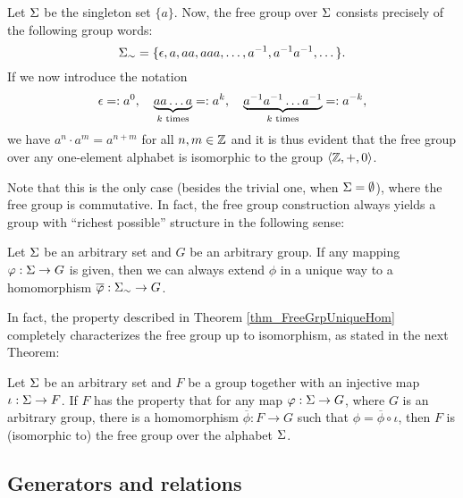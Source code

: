 \begin{example}
Let $\Sigma$ be the singleton set $\{a\}$. Now, the free group over $\Sigma$ consists precisely of the following group words:
\begin{equation*}
{\Sigma}_{\sim} = \{\epsilon, a, aa, aaa, \dots, {a}^{-1}, {a}^{-1}{a}^{-1},\dots\}.
\end{equation*}
If we now introduce the notation
\begin{equation*}
\epsilon =: a^0, \quad 
\underbrace{a a \dots a}_{k \text{ times}} =: a^k, \quad
\underbrace{{a}^{-1} {a}^{-1} \dots {a}^{-1}}_{k \text{ times}} =: a^{-k},
\end{equation*}
we have $a^n \cdot a^m = a^{n+m}$ for all $n,m \in \mathbb{Z}$ and it is thus evident that the free group over any one-element alphabet is isomorphic to the group $\langle \mathbb{Z}, +, 0 \rangle$. 

Note that this is the only case (besides the trivial one, when $\Sigma = \emptyset$), where the free group is commutative. In fact, the free group construction always yields a group with ``richest possible'' structure in the following sense:

\begin{theorem}
\label{thm_FreeGrpUniqueHom}
Let $\Sigma$ be an arbitrary set and $G$ be an arbitrary group. If any mapping $\varphi : \Sigma \to G$ is given, then we can always extend $\phi$ in a unique way to a homomorphism $\overline{\varphi}: {\Sigma}_{\sim} \to G$.
\end{theorem}

In fact, the property described in Theorem \ref{thm_FreeGrpUniqueHom} completely characterizes the free group up to isomorphism, as stated in the next Theorem:

\begin{theorem}
\label{thm_FreeGrpUnivMapProp}
Let $\Sigma$ be an arbitrary set and $F$ be a group together with an injective map $\iota : \Sigma \to F$. If $F$ has the property that for any map $\varphi : \Sigma \to G$, where $G$ is an arbitrary group, there is a homomorphism $\overline{\phi} : F \to G$ such that $\phi = \overline{\phi} \circ \iota$,
then $F$ is (isomorphic to) the free group over the alphabet $\Sigma$.
\end{theorem}

\end{example}

\subsection{Generators and relations}

